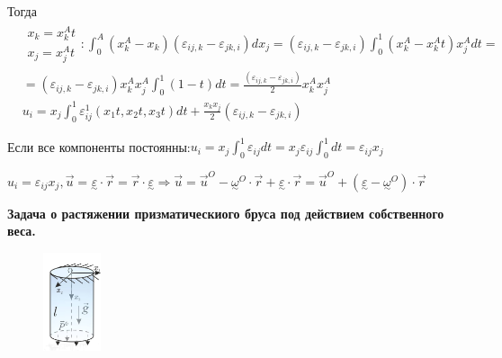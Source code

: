Тогда 
$$
\begin{aligned}
& \begin{array}{l}
x_k=x_k^A t \\
x_j=x_j^A t
\end{array}: \int_0^A\left(x_k^A-x_k\right)\left(\varepsilon_{i j, k}-\varepsilon_{j k, i}\right) d x_j=\left(\varepsilon_{i j, k}-\varepsilon_{j k, i}\right) \int_0^1\left(x_k^A-x_k^A t\right) x_j^A d t= \\
& =\left(\varepsilon_{i j, k}-\varepsilon_{j k, i}\right) x_k^A x_j^A \int_0^1(1-t) d t=\frac{\left(\varepsilon_{i j, k}-\varepsilon_{j k, i}\right)}{2} x_k^A x_j^A \\
& u_i=x_j \int_0^1 \varepsilon_{i j}^1\left(x_1 t, x_2 t, x_3 t\right) d t+\frac{x_k x_j}{2}\left(\varepsilon_{i j, k}-\varepsilon_{j k, i}\right)
\end{aligned}
$$

Если все компоненты постоянны:$\displaystyle u_i=x_j \int_0^1 \varepsilon_{i j} d t =  x_j \varepsilon_{i j} \int_0^1 d t=\varepsilon_{i j} x_j$


$\displaystyle
u_i=\varepsilon_{i j} x_j, \vec{u}=\underset{\sim}{\varepsilon} \cdot \vec{r}=\vec{r} \cdot \underset{\sim}{\varepsilon} \Rightarrow
\vec{u}=\vec{u}^O-{\underset{\sim}{\omega}}^O \cdot \vec{r}+\underset{\sim}{\varepsilon} \cdot \vec{r}=\vec{u}^O+\left(\underset{\sim}{\varepsilon}-{\underset{\sim}{\omega}}^O\right) \cdot \vec{r}
$


\textbf{Задача о растяжении призматическиого бруса под действием собственного веса.}

\begin{figure}[h!]
  \centering
  \includegraphics[width=0.15\textwidth]{images/14.3.jpg}    
\end{figure}


